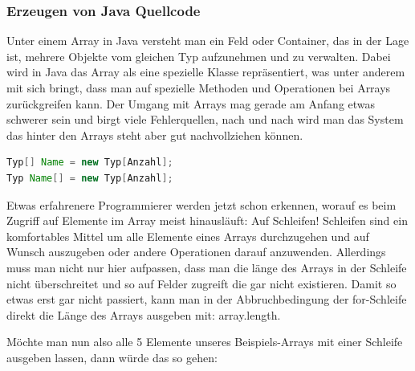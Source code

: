\documentclass[
    headings=optiontotocandhead,%
    twoside,
    numbers=noenddot,%
    12pt, %
    titlepage, %
    parskip=full, %
    listof=leveldown, 
    numbers=noenddot, %
    a4paper,DIV=14,
    BCOR=15mm,
]{scrbook}
\begin{document}
\hypertarget{erzeugen-von-java-quellcode}{%
\subsubsection{Erzeugen von Java
Quellcode}\label{erzeugen-von-java-quellcode}}

Unter einem Array in Java versteht man ein Feld oder Container, das in
der Lage ist, mehrere Objekte vom gleichen Typ aufzunehmen und zu
verwalten. Dabei wird in Java das Array als eine spezielle Klasse
repräsentiert, was unter anderem mit sich bringt, dass man auf spezielle
Methoden und Operationen bei Arrays zurückgreifen kann. Der Umgang mit
Arrays mag gerade am Anfang etwas schwerer sein und birgt viele
Fehlerquellen, nach und nach wird man das System das hinter den Arrays
steht aber gut nachvollziehen können.

\begin{lstlisting}[language=Java, caption={Initialisieren eines Arrays}]
Typ[] Name = new Typ[Anzahl];
Typ Name[] = new Typ[Anzahl];
\end{lstlisting}

Etwas erfahrenere Programmierer werden jetzt schon erkennen, worauf es
beim Zugriff auf Elemente im Array meist hinausläuft: Auf Schleifen!
Schleifen sind ein komfortables Mittel um alle Elemente eines Arrays
durchzugehen und auf Wunsch auszugeben oder andere Operationen darauf
anzuwenden. Allerdings muss man nicht nur hier aufpassen, dass man die
länge des Arrays in der Schleife nicht überschreitet und so auf Felder
zugreift die gar nicht existieren. Damit so etwas erst gar nicht
passiert, kann man in der Abbruchbedingung der for-Schleife direkt die
Länge des Arrays ausgeben mit: array.length.

Möchte man nun also alle 5 Elemente unseres Beispiels-Arrays mit einer
Schleife ausgeben lassen, dann würde das so gehen:
\end{document}
